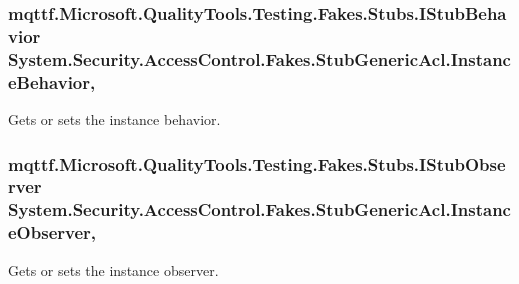 \hypertarget{class_system_1_1_security_1_1_access_control_1_1_fakes_1_1_stub_generic_acl_ae7d1d884d9e5ccc03ff4c85933d9ee7c}{
\subsubsection[{Instance\-Behavior}]{\setlength{\rightskip}{0pt plus 5cm}mqttf.\-Microsoft.\-Quality\-Tools.\-Testing.\-Fakes.\-Stubs.\-I\-Stub\-Behavior System.\-Security.\-Access\-Control.\-Fakes.\-Stub\-Generic\-Acl.\-Instance\-Behavior\hspace{0.3cm}{\ttfamily [get]}, {\ttfamily [set]}}}\label{class_system_1_1_security_1_1_access_control_1_1_fakes_1_1_stub_generic_acl_ae7d1d884d9e5ccc03ff4c85933d9ee7c}


Gets or sets the instance behavior.

\hypertarget{class_system_1_1_security_1_1_access_control_1_1_fakes_1_1_stub_generic_acl_a0a7be334126722178b683d0be628aabb}{
\subsubsection[{Instance\-Observer}]{\setlength{\rightskip}{0pt plus 5cm}mqttf.\-Microsoft.\-Quality\-Tools.\-Testing.\-Fakes.\-Stubs.\-I\-Stub\-Observer System.\-Security.\-Access\-Control.\-Fakes.\-Stub\-Generic\-Acl.\-Instance\-Observer\hspace{0.3cm}{\ttfamily [get]}, {\ttfamily [set]}}}\label{class_system_1_1_security_1_1_access_control_1_1_fakes_1_1_stub_generic_acl_a0a7be334126722178b683d0be628aabb}


Gets or sets the instance observer.

